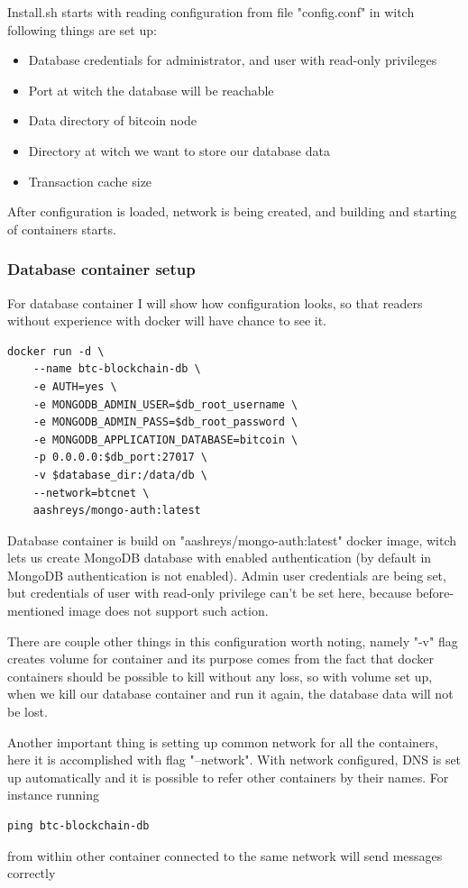 \documentclass[12pt, en, eng]{mgr}
\begin{document}
Install.sh starts with reading configuration from file "config.conf" in witch following things are set up:

\begin{itemize}
\item
Database credentials for administrator, and user with read-only privileges
\item
Port at witch the database will be reachable
\item
Data directory of bitcoin node
\item
Directory at witch we want to store our database data
\item
Transaction cache size
\end{itemize} 

After configuration is loaded, network is being created, and building and starting of containers starts.

\subsubsection{Database container setup}
For database container I will show how configuration looks, so that readers without experience with docker will have chance to see it.

\begin{verbatim}
docker run -d \
    --name btc-blockchain-db \
    -e AUTH=yes \
    -e MONGODB_ADMIN_USER=$db_root_username \
    -e MONGODB_ADMIN_PASS=$db_root_password \
    -e MONGODB_APPLICATION_DATABASE=bitcoin \
    -p 0.0.0.0:$db_port:27017 \
    -v $database_dir:/data/db \
    --network=btcnet \
    aashreys/mongo-auth:latest
\end{verbatim}

Database container is build on "aashreys/mongo-auth:latest" docker image, witch lets us create MongoDB database with enabled authentication (by default in MongoDB authentication is not enabled).
Admin user credentials are being set, but credentials of user with read-only privilege can't be set here, because before-mentioned image does not support such action.

There are couple other things in this configuration worth noting, namely "-v" flag creates volume for container and its purpose comes from the fact that docker containers should be possible to kill without any loss, so with volume set up, when we kill our database container and run it again, the database data will not be lost.

Another important thing is setting up common network for all the containers, here it is accomplished with flag "--network". With network configured, DNS is set up automatically and it is possible to refer other containers by their names. For instance running 
\begin{verbatim}
ping btc-blockchain-db
\end{verbatim}  
from within other container connected to the same network will send messages correctly
\end{document}
